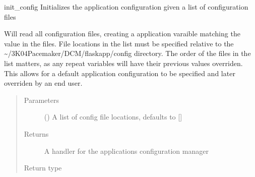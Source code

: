 \documentclass[letterpaper,10pt,english]{sphinxmanual}
\begin{document}
\begin{fulllineitems}
\label{\detokenize{flaskapp.config:flaskapp.config.config_manager.init_config}}
init\_config Initializes the application configuration given a list of configuration files

Will read all configuration files, creating a application varaible matching the value in the
files. File locations in the list must be specified relative to the \textasciitilde{}/3K04\sphinxhyphen{}Pacemaker/DCM/flaskapp/config
directory. The order of the files in the list matters, as any repeat variables will have their previous
values overriden. This allows for a default application configuration to be specified and later overriden
by an end user.
\begin{quote}\begin{description}
\item[{Parameters}] \leavevmode
{} (\sphinxstyleliteralemphasis{\sphinxupquote{, }}) \textendash{} A list of config file locations, defaults to {[}{]}

\item[{Returns}] \leavevmode
A handler for the applications configuration manager

\item[{Return type}] \leavevmode
{}

\end{description}\end{quote}

\end{fulllineitems}

\end{document}
